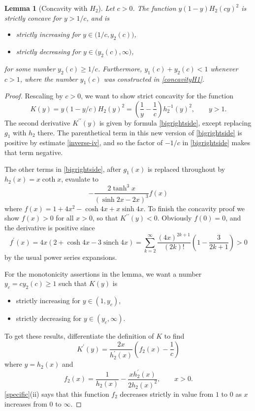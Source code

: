 \documentclass[12pt,reqno]{amsart}
\newtheorem{lemma}[lemma]{Lemma}
\theoremstyle{definition}
\newcommand{\htwo}{H_2}
\newcommand{\sinch}{\operatorname{sinch}}
\begin{document}
%
\begin{lemma}[Concavity with $\htwo$]\label{concavityhtwo} 
Let $c>0$. The function $y(1-y)\htwo(cy)^2$ is strictly concave for $y>1/c$, and is 
%
\begin{itemize}
\item strictly increasing for $y \in \big(1/c, y_2(c)\big)$, 
\item strictly decreasing for $y \in \big(y_2(c),\infty\big)$, 
\end{itemize}
%
for some number $y_2(c) \geq 1/c$. Furthermore, $y_1(c)+y_2(c)<1$ whenever $c>1$, where the number $y_1(c)$ was constructed in \autoref{concavityH1}.
\end{lemma}
%
\begin{proof}
Rescaling by $c>0$, we want to show strict concavity for the function 
\[
K(y) = y(1-y/c)\htwo(y)^2 = \left( \frac{1}{y} - \frac{1}{c} \right) h_2^{-1}(y)^2 , \qquad y > 1 .
\]
The second derivative $K^{\prime \prime}(y)$ is given by formula \eqref{bigrightside}, except replacing $g_1$ with $h_2$ there. The parenthetical term in this new version of \eqref{bigrightside} is positive by estimate \eqref{inverse-iv}, and so the factor of $-1/c$ in \eqref{bigrightside} makes that term negative.

The other terms in \eqref{bigrightside}, after $g_1(x)$ is replaced throughout by $h_2(x)=x \coth x$, evaulate to 
\[
-\frac{2\tanh^3 x}{(\sinh 2x - 2x)^3} f(x)
\]
where $f(x) = 1 + 4x^2 - \cosh 4x + x \sinh 4x$. To finish the concavity proof we show $f(x)>0$ for all $x>0$, so that $K^{\prime \prime}(y)<0$. Obviously $f(0)=0$, and the derivative is positive since 
\[
f^\prime(x) = 4x ( 2 + \cosh 4x - 3 \sinch 4x) = \sum_{k=2}^\infty \frac{(4x)^{2k+1}}{(2k)!} \left( 1 - \frac{3}{2k+1} \right) > 0
\]
by the usual power series expansions. 

For the monotonicity assertions in the lemma, we want a number $y_c = cy_2(c) \geq 1$ such that $K(y)$ is 
%
\begin{itemize}
\item strictly increasing for $y \in (1, y_c)$, 
\item strictly decreasing for $y \in (y_c,\infty)$. 
\end{itemize}
%
To get these results, differentiate the definition of $K$ to find 
\[
K^\prime(y) = \frac{2x}{h_2^\prime(x)} \left( f_2(x) - \frac{1}{c} \right) 
\]
where $y=h_2(x)$ and 
\[
f_2(x) = \frac{1}{h_2(x)} - \frac{x h_2^\prime(x)}{2h_2(x)^2} , \qquad x>0 .
\]
\autoref{specific}(ii) says that this function $f_2$ decreases strictly in value from $1$ to $0$ as $x$ increases from $0$ to $\infty$. 


\end{proof}
\end{document}
